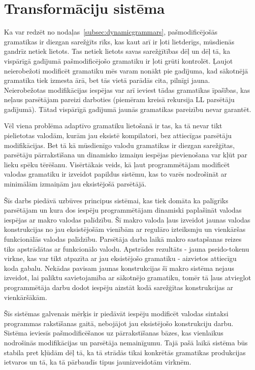 \section{Transformāciju sistēma}
Ka var redzēt no nodaļas~\ref{subsec:dynamicgrammars}, pašmodificējošās gramatikas ir diezgan sarežģīts rīks, kas kaut arī ir ļoti lietderīgs, mūsdienās gandrīz netiek lietots. Tas netiek lietots savas sarežģītības dēļ un dēļ tā, ka vispārīgā gadījumā pašmodificējošo gramatiku ir ļoti grūti kontrolēt. Ļaujot neierobežoti modificēt gramatiku mēs varam nonākt pie gadījuma, kad sākotnējā gramatika tiek izmesta ārā, bet tās vietā parādās cita, pilnīgi jauna. Neierobežotas modifikācijas iespējas var arī ieviest tādas gramatikas īpašības, kas neļaus parsētājam pareizi darboties (piemēram kreisā rekursija LL parsētāju gadījumā). Tātad vispārīgā gadījumā jaunās gramatikas pareizību nevar garantēt.

Vēl viena problēma adaptīvo gramatiku lietošanā ir tas, ka tā nevar tikt pielietotas valodām, kurām jau eksistē kompilatori, bez attiecīgas parsētāju modifikācijas. Bet tā kā mūsdienīgo valodu gramatikas ir diezgan sarežģītas, parsētāju pārrakstīšana un dinamisko izmaiņu iespējas pievienošana var kļūt par lieku spēku tērēšanu. Visērtākais veids, kā ļaut programmētājam modificēt valodas gramatiku ir izveidot papildus sistēmu, kas to varēs nodrošināt ar minimālām izmaiņām jau eksistējošā parsētājā.

Šīs darbs piedāvā uzbūves principus sistēmai, kas tiek domāta ka palīgrīks parsētājam un kura dos iespēju programmētājam dinamiski paplašināt valodas iespējas ar makro valodas palīdzību. Šī makro valoda ļaus izveidot jaunas valodas konstrukcijas no jau eksistējošām vienībām ar regulāro izteiksmju un vienkāršas funkcionālās valodas palīdzību. Parsētāja darba laikā makro sastapšanas reizes tiks apstrādātas ar funkcionālo valodu. Apstrādes rezultāts - jauna pseido-tokenu virkne, kas var tikt atpazīta ar jau eksistējošo gramatiku - aizvietos attiecīgu koda gabalu. Nekādas pavisam jaunas konstrukcijas šī makro sistēma nejaus izveidot, lai paliktu savietojamība ar sākotnējo gramatiku, tomēr tā ļaus atvieglot programmētāja darbu dodot iespēju aizstāt kodā sarežģītas konstrukcijas ar vienkāršākām. 

Šīs sistēmas galvenais mērķis ir piedāvāt iespēju modificēt valodas sintaksi programmas rakstīšanas gaitā, nebojājot jau eksistējošo konstrukciju darbu. Sistēma ieviesīs pašmodificēšanos uz pārrakstīšanas bāzes, kas vienlaikus nodrošinās modifikācijas un parsētāja nemainīgumu. Tajā pašā laikā sistēma būs stabila pret kļūdām dēļ tā, ka tā strādās tikai konkrētās gramatikas produkcijas ietvaros un tā, ka tā pārbaudīs tipus jaunizveidotām virknēm.

